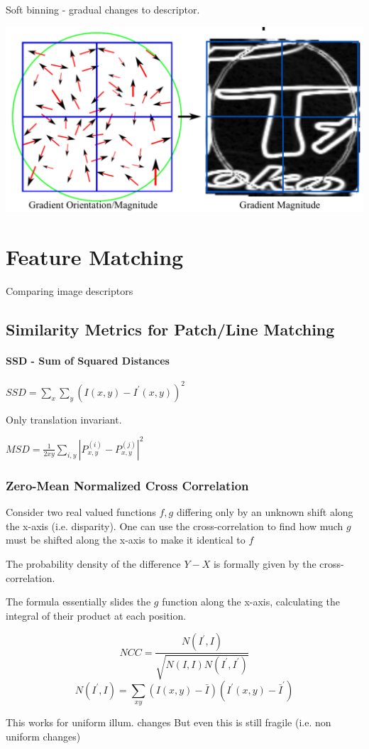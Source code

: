 Soft binning - gradual changes to descriptor.

\includegraphics[width=0.4\columnwidth]{cv_figures/lowe.png}

\section{Feature Matching}

Comparing image descriptors

\subsection{ Similarity Metrics for Patch/Line Matching}

\paragraph*{ SSD - Sum of Squared Distances}

$SSD = \sum_x \sum_y (I(x,y) - I^\prime(x,y))^2$

Only translation invariant.

$MSD=\frac{1}{2xy} \sum_{i,y}\left|P_{x,y}^{(i)} - P^{(j)}_{x,y}\right|^2$


\subsubsection{Zero-Mean Normalized Cross Correlation}
Consider two real valued functions  $f,g$  differing only by an unknown shift along the x-axis (i.e. disparity). One can use the cross-correlation to find how much $g$ must be shifted along the x-axis to make it identical to $f$ 

The probability density of the difference $Y-X$ is formally given by the cross-correlation.

The formula essentially slides the $g$ function along the x-axis, calculating the integral of their product at each position.

$$ NCC = \frac{N(I^\prime,I)}{\sqrt{N(I,I)N(I^\prime,I^\prime)}} $$
$$ N(I^\prime,I) = \sum_{xy} (I(x,y) - \bar I )(I^\prime(x,y) - \bar I^\prime ) $$

This works for uniform illum. changes
But even this is still fragile (i.e. non uniform changes)


